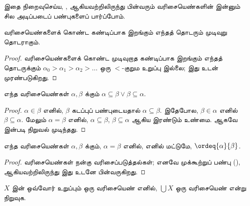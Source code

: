 \documentclass[../../../include/open-logic-section]{subfiles}
\begin{document}
இதை நிறைவுசெய்ய, ,
 ஆகியவற்றிலிருந்து பின்வரும் வரிசையெண்களின் இன்னும்
சில அடிப்படைப் பண்புகளைப் பார்ப்போம்.

\begin{prop}
வரிசையெண்களைக் கொண்ட கண்டிப்பாக இறங்கும் எந்தத் தொடரும் முடிவுறு தொடராகும்.
\end{prop}

\begin{proof}
வரிசையெண்களைக் கொண்ட முடிவுறாத கண்டிப்பாக இறங்கும் எந்தத் தொடருக்கும்
$\alpha_0 > \alpha_1 > \alpha_2 > \ldots$ ஒரு $<$-குறும உறுப்பு
இல்லை; இது  உடன் முரண்படுகிறது.
\end{proof}

\begin{prop}
எந்த வரிசையெண்கள் $\alpha, \beta$ க்கும்
$\alpha \subseteq \beta \lor \beta \subseteq \alpha$.
\end{prop}

\begin{proof}
$\alpha \in \beta$ எனில், $\beta$ கடப்புப் பண்புடையதால்
$\alpha \subseteq \beta$. இதேபோல, $\beta \in \alpha$ எனில்
$\beta \subseteq \alpha$. மேலும் $\alpha = \beta$ எனில்,
$\alpha \subseteq \beta$, $\beta \subseteq \alpha$ ஆகிய இரண்டும்
உண்மை. ஆகவே  இன்படி நிறுவல் முடிந்தது.
\end{proof}

\begin{prop}
எந்த வரிசையெண்கள் $\alpha, \beta$ க்கும், $\alpha = \beta$ எனில்,
எனில் மட்டுமே, $\ordeq{\alpha}{\beta}$.
\end{prop}

\begin{proof}
வரிசையெண்கள் நன்கு வரிசைப்படுத்தல்கள்; எனவே முக்கூற்றுப் பண்பு
(), 
ஆகியவற்றிலிருந்து இது உடனே பின்வருகிறது.
\end{proof}

\begin{prob}
$X$ இன் ஒவ்வோர் உறுப்பும் ஒரு வரிசையெண் எனில், $\bigcup X$ ஒரு
வரிசையெண் என்று நிறுவுக.
\end{prob}
\end{document}
